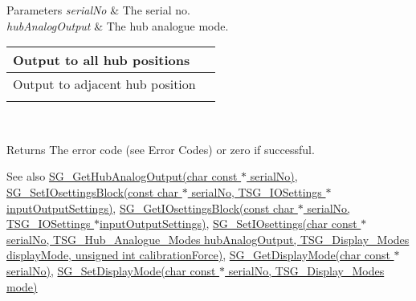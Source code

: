 \begin{DoxyParams}{Parameters}
{\em serial\+No} & The serial no. \\
\hline
{\em hub\+Analog\+Output} & The hub analogue mode. \begin{tabularx}{\linewidth}{|*{2}{>{\raggedright\arraybackslash}X|}}\hline
Output to all hub positions&1 \\\cline{1-2}
Output to adjacent hub position&2 \\\cline{1-2}
\end{tabularx}
\\
\hline
\end{DoxyParams}
\begin{DoxyReturn}{Returns}
The error code (see Error Codes) or zero if successful. 
\end{DoxyReturn}
\begin{DoxySeeAlso}{See also}
\hyperlink{group___t_cube_strain_gauge_ga030582bb729784e5ae8ba7fe7e7ef1ed}{S\+G\+\_\+\+Get\+Hub\+Analog\+Output(char const $\ast$ serial\+No)}, \hyperlink{group___t_cube_strain_gauge_gaa4deca95b8a8df64164599d6ccbd0693}{S\+G\+\_\+\+Set\+I\+Osettings\+Block(const char $\ast$ serial\+No, T\+S\+G\+\_\+\+I\+O\+Settings $\ast$input\+Output\+Settings)}, \hyperlink{group___t_cube_strain_gauge_ga82272877fefa4a5531f563a190f8b1e3}{S\+G\+\_\+\+Get\+I\+Osettings\+Block(const char $\ast$ serial\+No, T\+S\+G\+\_\+\+I\+O\+Settings $\ast$input\+Output\+Settings)}, \hyperlink{group___t_cube_strain_gauge_gaf816bcf97699810c3ad2e31f28bf136e}{S\+G\+\_\+\+Set\+I\+Osettings(char const $\ast$ serial\+No, T\+S\+G\+\_\+\+Hub\+\_\+\+Analogue\+\_\+\+Modes hub\+Analog\+Output, T\+S\+G\+\_\+\+Display\+\_\+\+Modes display\+Mode, unsigned int calibration\+Force)}, \hyperlink{group___t_cube_strain_gauge_gaa5b67bce46e10d40186ad1d8f3febb15}{S\+G\+\_\+\+Get\+Display\+Mode(char const $\ast$ serial\+No)}, \hyperlink{group___t_cube_strain_gauge_ga97a7cb9056e7e4729a922eed5d1f7fcf}{S\+G\+\_\+\+Set\+Display\+Mode(char const $\ast$ serial\+No, T\+S\+G\+\_\+\+Display\+\_\+\+Modes mode)}


\end{DoxySeeAlso}

